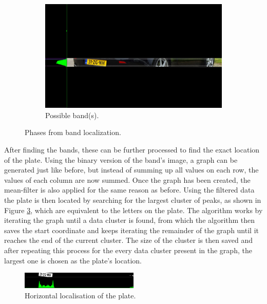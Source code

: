\begin{figure}[h]
        \begin{subfigure}{0.5\textwidth}
            \includegraphics[width=\textwidth]{plaatjes/3-peaks}
            \caption{Possible band(s).}
            \label{fig:possible-bands}
        \end{subfigure}%

        \caption{Phases from band localization.}
        \label{fig:find-band}
\end{figure}


After finding the bands, these can be further processed to find the exact location of the plate. Using the binary version of the band's image, a graph can be generated just like before, but instead of summing up all values on each row, the values of each column are now summed. Once the graph has been created, the mean-filter is also applied for the same reason as before. Using the filtered data the plate is then located by searching for the largest cluster of peaks, as shown in Figure \ref{fig:band-cropped}, which are equivalent to the letters on the plate. The algorithm works by iterating the graph until a data cluster is found, from which the algorithm then saves the start coordinate and keeps iterating the remainder of the graph until it reaches the end of the current cluster. The size of the cluster is then saved and after repeating this process for the every data cluster present in the graph, the largest one is chosen as the plate's location. 

\begin{figure}[h]
    \centering
    \includegraphics[width=0.5\textwidth]{plaatjes/plate-graph}
    \caption{Horizontal localisation of the plate.}
    \label{fig:band-cropped}
\end{figure}

